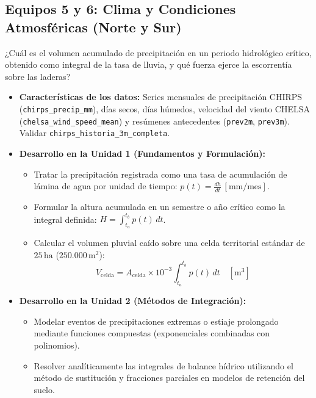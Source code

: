 \documentclass[11pt,a4paper]{article}
\begin{document}
\subsection{Equipos 5 y 6: Clima y Condiciones Atmosféricas (Norte y Sur)}
\begin{guidelinebox}[title=Pregunta Guía Central]
¿Cuál es el volumen acumulado de precipitación en un periodo hidrológico crítico, obtenido como integral de la tasa de lluvia, y qué fuerza ejerce la escorrentía sobre las laderas?
\end{guidelinebox}

\begin{itemize}[leftmargin=*,itemsep=1.5pt]
  \item \textbf{Características de los datos:} Series mensuales de precipitación CHIRPS (\texttt{chirps\_precip\_mm}), días secos, días húmedos, velocidad del viento CHELSA (\texttt{chelsa\_wind\_speed\_mean}) y resúmenes antecedentes (\texttt{prev2m}, \texttt{prev3m}). Validar \texttt{chirps\_historia\_3m\_completa}.
  \item \textbf{Desarrollo en la Unidad 1 (Fundamentos y Formulación):}
  \begin{itemize}
    \item Tratar la precipitación registrada como una tasa de acumulación de lámina de agua por unidad de tiempo: $p(t) = \frac{dh}{dt}\,[\text{mm/mes}]$.
    \item Formular la altura acumulada en un semestre o año crítico como la integral definida: $H = \int_{t_a}^{t_b} p(t)\,dt$.
    \item Calcular el volumen pluvial caído sobre una celda territorial estándar de $25\,\text{ha}$ ($250.000\,\text{m}^2$):
    \begin{equation*}
      V_{\text{celda}} = A_{\text{celda}} \times 10^{-3} \int_{t_a}^{t_b} p(t)\,dt \quad [\text{m}^3]
    \end{equation*}
  \end{itemize}
  \item \textbf{Desarrollo en la Unidad 2 (Métodos de Integración):}
  \begin{itemize}
    \item Modelar eventos de precipitaciones extremas o estiaje prolongado mediante funciones compuestas (exponenciales combinadas con polinomios).
    \item Resolver analíticamente las integrales de balance hídrico utilizando el método de sustitución y fracciones parciales en modelos de retención del suelo.
  \end{itemize}

\end{itemize}
\end{document}
